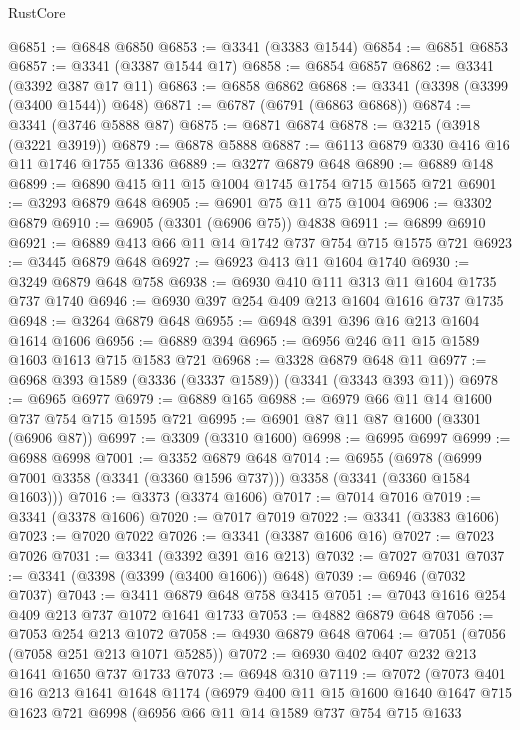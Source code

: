 \begin{lexlean}{RustCore}
\begin{coremodule}
@6851 := @6848 @6850
@6853 := @3341 (@3383 @1544)
@6854 := @6851 @6853
@6857 := @3341 (@3387 @1544 @17)
@6858 := @6854 @6857
@6862 := @3341 (@3392 @387 @17 @11)
@6863 := @6858 @6862
@6868 := @3341 (@3398 (@3399 (@3400 @1544)) @648)
@6871 := @6787 (@6791 (@6863 @6868))
@6874 := @3341 (@3746 @5888 @87)
@6875 := @6871 @6874
@6878 := @3215 (@3918 (@3221 @3919))
@6879 := @6878 @5888
@6887 := @6113 @6879 @330 @416 @16 @11 @1746 @1755 @1336
@6889 := @3277 @6879 @648
@6890 := @6889 @148
@6899 := @6890 @415 @11 @15 @1004 @1745 @1754 @715 @1565 @721
@6901 := @3293 @6879 @648
@6905 := @6901 @75 @11 @75 @1004
@6906 := @3302 @6879
@6910 := @6905 (@3301 (@6906 @75)) @4838
@6911 := @6899 @6910
@6921 := @6889 @413 @66 @11 @14 @1742 @737 @754 @715 @1575 @721
@6923 := @3445 @6879 @648
@6927 := @6923 @413 @11 @1604 @1740
@6930 := @3249 @6879 @648 @758
@6938 := @6930 @410 @111 @313 @11 @1604 @1735 @737 @1740
@6946 := @6930 @397 @254 @409 @213 @1604 @1616 @737 @1735
@6948 := @3264 @6879 @648
@6955 := @6948 @391 @396 @16 @213 @1604 @1614 @1606
@6956 := @6889 @394
@6965 := @6956 @246 @11 @15 @1589 @1603 @1613 @715 @1583 @721
@6968 := @3328 @6879 @648 @11
@6977 := @6968 @393 @1589 (@3336 (@3337 @1589)) (@3341 (@3343 @393 @11))
@6978 := @6965 @6977
@6979 := @6889 @165
@6988 := @6979 @66 @11 @14 @1600 @737 @754 @715 @1595 @721
@6995 := @6901 @87 @11 @87 @1600 (@3301 (@6906 @87))
@6997 := @3309 (@3310 @1600)
@6998 := @6995 @6997
@6999 := @6988 @6998
@7001 := @3352 @6879 @648
@7014 := @6955
    (@6978 (@6999 @7001 @3358 (@3341 (@3360 @1596 @737))) @3358 (@3341 (@3360 @1584 @1603)))
@7016 := @3373 (@3374 @1606)
@7017 := @7014 @7016
@7019 := @3341 (@3378 @1606)
@7020 := @7017 @7019
@7022 := @3341 (@3383 @1606)
@7023 := @7020 @7022
@7026 := @3341 (@3387 @1606 @16)
@7027 := @7023 @7026
@7031 := @3341 (@3392 @391 @16 @213)
@7032 := @7027 @7031
@7037 := @3341 (@3398 (@3399 (@3400 @1606)) @648)
@7039 := @6946 (@7032 @7037)
@7043 := @3411 @6879 @648 @758 @3415
@7051 := @7043 @1616 @254 @409 @213 @737 @1072 @1641 @1733
@7053 := @4882 @6879 @648
@7056 := @7053 @254 @213 @1072
@7058 := @4930 @6879 @648
@7064 := @7051 (@7056 (@7058 @251 @213 @1071 @5285))
@7072 := @6930 @402 @407 @232 @213 @1641 @1650 @737 @1733
@7073 := @6948 @310
@7119 := @7072
    (@7073
      @401
      @16
      @213
      @1641
      @1648
      @1174
      (@6979
        @400
        @11
        @15
        @1600
        @1640
        @1647
        @715
        @1623
        @721
        @6998
        (@6956
          @66
          @11
          @14
          @1589
          @737
          @754
          @715
          @1633

\end{coremodule}
\end{lexlean}
